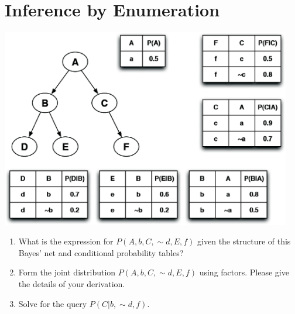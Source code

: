 \documentclass[12pt]{article}
\begin{document}
\clearpage

\section{Inference by Enumeration}

\begin{center}
\includegraphics[width=5in]{enumeration.eps}
\end{center}

\begin{enumerate}

\item What is the expression for $P(A,b,C, \sim d,E,f)$ given the structure
  of this Bayes' net and conditional probability tables?

\item Form the joint distribution  $P(A,b,C, \sim d,E,f)$ using factors.  Please give the
  details of your derivation.

\item Solve for the query $P(C | b, \sim d, f)$.

\end{enumerate}
\end{document}
